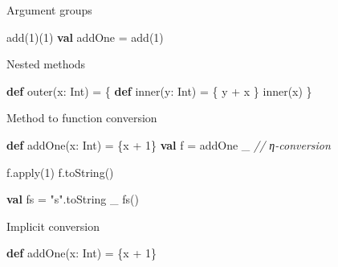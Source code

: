 \documentclass[ignorenonframetext,]{beamer}
\newenvironment{Shaded}{\begin{snugshade}}{\end{snugshade}}
\newcommand{\KeywordTok}[1]{\textcolor[rgb]{0.13,0.29,0.53}{\textbf{#1}}}
\newcommand{\DecValTok}[1]{\textcolor[rgb]{0.00,0.00,0.81}{#1}}
\newcommand{\StringTok}[1]{\textcolor[rgb]{0.31,0.60,0.02}{#1}}
\newcommand{\CommentTok}[1]{\textcolor[rgb]{0.56,0.35,0.01}{\textit{#1}}}
\newcommand{\FunctionTok}[1]{\textcolor[rgb]{0.00,0.00,0.00}{#1}}
\newcommand{\NormalTok}[1]{#1}
\begin{document}
\begin{frame}[fragile]
\begin{block}{Argument groups}
\begin{Shaded}
\begin{Highlighting}[]
\FunctionTok{add}\NormalTok{(}\DecValTok{1}\NormalTok{)(}\DecValTok{1}\NormalTok{)}
\KeywordTok{val}\NormalTok{ addOne = }\FunctionTok{add}\NormalTok{(}\DecValTok{1}\NormalTok{)}
\end{Highlighting}
\end{Shaded}

\end{block}

\begin{block}{Nested methods}

\begin{Shaded}
\begin{Highlighting}[]
\KeywordTok{def} \FunctionTok{outer}\NormalTok{(x: Int) = \{}
    \KeywordTok{def} \FunctionTok{inner}\NormalTok{(y: Int) = \{}
\NormalTok{        y + x}
\NormalTok{    \}}
    \FunctionTok{inner}\NormalTok{(x)}
\NormalTok{\}}
\end{Highlighting}
\end{Shaded}

\end{block}

\begin{block}{Method to function conversion}

\begin{Shaded}
\begin{Highlighting}[]
\KeywordTok{def} \FunctionTok{addOne}\NormalTok{(x: Int) = \{x + }\DecValTok{1}\NormalTok{\}}
\KeywordTok{val}\NormalTok{ f = addOne _             }\CommentTok{// η-conversion}

\NormalTok{f.}\FunctionTok{apply}\NormalTok{(}\DecValTok{1}\NormalTok{)}
\NormalTok{f.}\FunctionTok{toString}\NormalTok{()}
\end{Highlighting}
\end{Shaded}

\begin{Shaded}
\begin{Highlighting}[]
\KeywordTok{val}\NormalTok{ fs = }\StringTok{"s"}\NormalTok{.}\FunctionTok{toString}\NormalTok{ _}
\FunctionTok{fs}\NormalTok{()}
\end{Highlighting}
\end{Shaded}

\end{block}

\begin{block}{Implicit conversion}

\begin{Shaded}
\begin{Highlighting}[]
\KeywordTok{def} \FunctionTok{addOne}\NormalTok{(x: Int) = \{x + }\DecValTok{1}\NormalTok{\}}


\end{Highlighting}
\end{Shaded}
\end{block}
\end{frame}
\end{document}
